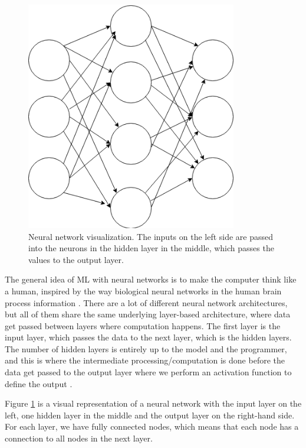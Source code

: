 \begin{figure}[!ht]
    \begin{center}
        \includegraphics[height=10cm]{neural_net.png}
        \caption{Neural network visualization. The inputs on the left side are passed into the neurons in the hidden layer in the middle, which passes the values to the output layer.}
        \label{figure:neural_net}
    \end{center}
\end{figure}

The general idea of ML with neural networks is to make the computer think like a human, inspired by the way biological neural networks in the human brain process information \cite{deep_learning}. There are a lot of different neural network architectures, but all of them share the same underlying layer-based architecture, where data get passed between layers where computation happens. The first layer is the input layer, which passes the data to the next layer, which is the hidden layers. The number of hidden layers is entirely up to the model and the programmer, and this is where the intermediate processing/computation is done before the data get passed to the output layer where we perform an activation function to define the output \cite{deep_learning}.

Figure \ref{figure:neural_net} is a visual representation of a neural network with the input layer on the left, one hidden layer in the middle and the output layer on the right-hand side. For each layer, we have fully connected nodes, which means that each node has a connection to all nodes in the next layer.

